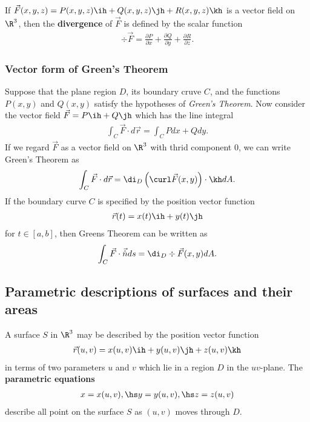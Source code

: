 \documentclass{article}
\begin{document}
\begin{definition}
    If $\vec F(x,y,z)=P(x,y,z)\ih + Q(x,y,z)\jh + R(x,y,z)\kh$ is a vector field on $\R^3$, then
    the \textbf{divergence} of $\vec F$ is defined by the scalar function
    \begin{align*}
        \div \vec F = \frac{\partial P}{\partial x}+\frac{\partial Q}{\partial y} + \frac{\partial R}{\partial z}.
    \end{align*}
\end{definition}

\subsubsection{Vector form of Green's Theorem}

\begin{theorem}
    Suppose that the plane region $D$, its boundary cruve $C$, and the functions
    $P(x,y)$ and $Q(x,y)$ satisfy the hypotheses of \emph{Green's Theorem}. Now
    consider the vector field $\vec F = P\ih + Q\jh$ which has the line integral
    \begin{align*}
        \int_C\vec F \cdot d\vec r = \int_C Pdx + Qdy.
    \end{align*}
    If we regard $\vec F$ as a vector field on $\R^3$ with thrid component $0$,
    we can write Green's Theorem as
    \begin{align*}
        \int_C\vec F \cdot d\vec r = \di_D\left(\curl\vec F(x,y)\right)\cdot\kh dA.
    \end{align*}
    If the boundary curve $C$ is specified by the position vector function
    \begin{align*}
        \vec r(t) = x(t)\ih + y(t)\jh
    \end{align*}
    for $t\in[a,b]$, then Greens Theorem can be written as
    \begin{align*}
        \int_C \vec F\cdot \vec{\hat n} ds = \di_D \div\vec F(x,y)dA.
    \end{align*}
\end{theorem}


\subsection{Parametric descriptions of surfaces and their areas}


\begin{definition}
    A surface $S$ in $\R^3$ may be described by the position vector function
    \begin{align*}
        \vec r(u,v) = x(u,v)\ih + y(u,v)\jh + z(u,v)\kh
    \end{align*}
    in terms of two parameters $u$ and $v$ which lie in a region $D$ in the $uv$-plane.
    The \textbf{parametric equations}
    \begin{align*}
        x = x(u,v),\hs y=y(u,v),\hs z=z(u,v)
    \end{align*}
    describe all point on the surface $S$ as $(u,v)$ moves through $D$.
\end{definition}
\end{document}
